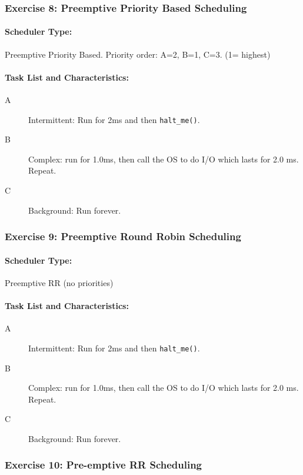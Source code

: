 \documentclass{article}	%
\begin{document}
\subsubsection{Exercise 8: Preemptive Priority Based Scheduling}

\paragraph{Scheduler Type:} Preemptive Priority Based. Priority order: A=2, B=1, C=3. (1= highest)
\paragraph{Task List and Characteristics:}  
            \begin{description} 
    \item [A] Intermittent: Run for 2ms and then {\tt halt\_me()}.
    \item [B] Complex:  run for 1.0ms, then call the OS to do I/O which
      lasts for 2.0 ms.  Repeat.
    \item [C] Background: Run forever.
\end{description}


\subsubsection{Exercise 9: Preemptive Round Robin Scheduling}

\paragraph{Scheduler Type:} Preemptive RR (no priorities)
\paragraph{Task List and Characteristics:}  
            \begin{description} 
    \item [A] Intermittent: Run for 2ms and then {\tt halt\_me()}.
    \item [B] Complex:  run for 1.0ms, then call the OS to do I/O which
      lasts for 2.0 ms.  Repeat.
    \item [C] Background: Run forever.
\end{description}
  



\subsubsection{Exercise 10: Pre-emptive RR Scheduling}
\end{document}
